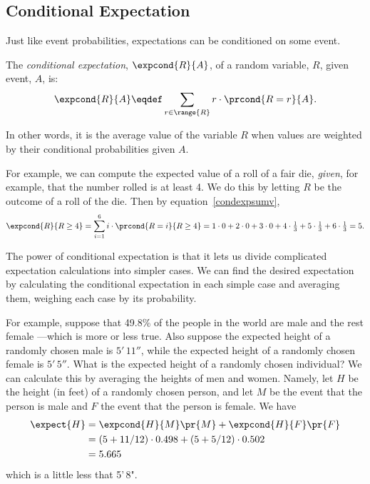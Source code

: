 \subsection{Conditional Expectation}

Just like event probabilities, expectations can be conditioned on some
event.
\begin{definition}\label{condexpdef} %
The \emph{conditional expectation}, $\expcond{R}{A}$, of a random
variable, $R$, given event, $A$, is:
\begin{equation}\label{condexpsumv}
\expcond{R}{A} \eqdef \sum_{r \in \range{R}} r \cdot\prcond{R=r}{A}.
\end{equation}
\end{definition}
In other words, it is the average value of the variable $R$ when values
are weighted by their conditional probabilities given $A$.

For example, we can compute the expected value of a roll of a fair die,
\emph{given}, for example, that the number rolled is at least 4.  We do
this by letting $R$ be the outcome of a roll of the die.  Then
by equation~\eqref{condexpsumv},
\[
\expcond{R}{R \geq 4} = \sum_{i=1}^6 i \cdot \prcond{R=i}{R \ge 4} 
= 1\cdot 0 + 2\cdot 0 + 3\cdot 0 + 
  4\cdot\tfrac{1}{3} + 5\cdot\tfrac{1}{3} + 6\cdot\tfrac{1}{3} 
= 5.
\]

The power of conditional expectation is that it lets us divide complicated
expectation calculations into simpler cases.  We can find the desired
expectation by calculating the conditional expectation in each simple case
and averaging them, weighing each case by its probability.

For example, suppose that 49.8\% of the people in the world are male and
the rest female ---which is more or less true.  Also suppose the expected
height of a randomly chosen male is $5'\,11''$, while the expected height
of a randomly chosen female is $5'\,5''$.  What is the expected height of a
randomly chosen individual?  We can calculate this by averaging the
heights of men and women.  Namely, let $H$ be the height (in feet) of a
randomly chosen person, and let $M$ be the event that the person is male
and $F$ the event that the person is female.  We have
\begin{align*}
\expect{H} &= \expcond{H}{M} \pr{M} + \expcond{H}{F} \pr{F}\\
&= (5 + 11/12) \cdot 0.498  + (5+ 5/12) \cdot 0.502\\
&= 5.665
\end{align*}
which is a little less that 5'\,8".

